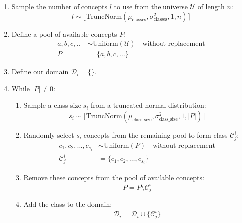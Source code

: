 \begin{enumerate}
    \item Sample the number of concepts $l$ to use from the universe $\mathcal{U}$ of length $n$:
          \begin{equation*}
              l \sim \lfloor\text{TruncNorm}(\mu_{\text{classes}}, \sigma^2_{\text{classes}}, 1, n)\rceil
          \end{equation*}
    \item Define a pool of available concepts $P$:
          \begin{align*}
              a, b, c, \ldots & \sim \text{Uniform}(\mathcal{U}) \quad \text{without replacement} \\
              P               & = \{a, b, c, \ldots\}
          \end{align*}
    \item Define our domain $\mathcal{D}_i = \{\}$.
    \item While $|P| \neq 0$:
          \begin{enumerate}
              \item Sample a class size $s_i$ from a truncated normal distribution:
                    \begin{equation*}
                        s_i \sim \lfloor\text{TruncNorm}(\mu_{\text{class\_size}}, \sigma^2_{\text{class\_size}}, 1, |P|)\rceil
                    \end{equation*}
              \item Randomly select $s_i$ concepts from the remaining pool to form class $\mathcal{C}_j^i$:
                    \begin{align*}
                        c_1, c_2, \ldots, c_{s_i} & \sim \text{Uniform}(P) \quad \text{without replacement} \\
                        \mathcal{C}_j^i           & = \{c_1, c_2, \ldots, c_{s_i}\}
                    \end{align*}
              \item Remove these concepts from the pool of available concepts:
                    \begin{equation*}
                        P = P \setminus \mathcal{C}_j^i
                    \end{equation*}
              \item Add the class to the domain:
                    \begin{equation*}
                        \mathcal{D}_i = \mathcal{D}_i \cup \{\mathcal{C}_j^i\}
                    \end{equation*}
          \end{enumerate}
\end{enumerate}

